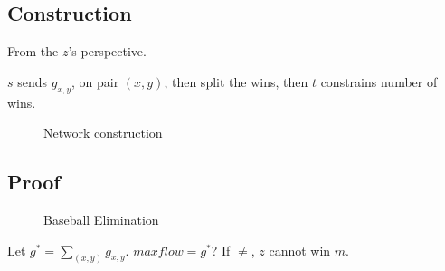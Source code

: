\documentclass[a4paper]{report}
\theoremstyle{definition}
\begin{document}
\subsection{Construction}
From the $z$'s perspective. 

$s$ sends $g_{x,y}$, on pair $(x,y)$, then split the wins, then $t$ constrains number of wins. 

\begin{figure}[!htp]
\centering
{}
\caption{Network construction}
\label{fig:baseball01}
\end{figure}

\subsection{Proof}
\begin{figure}[!htp]
\centering
{}
\caption{Baseball Elimination}
\label{fig:baseball}
\end{figure}
Let $g^*=\sum_{(x,y)} g_{x, y}$. $maxflow = g^*$? If $\neq$, $z$ cannot win $m$. 
\end{document}
